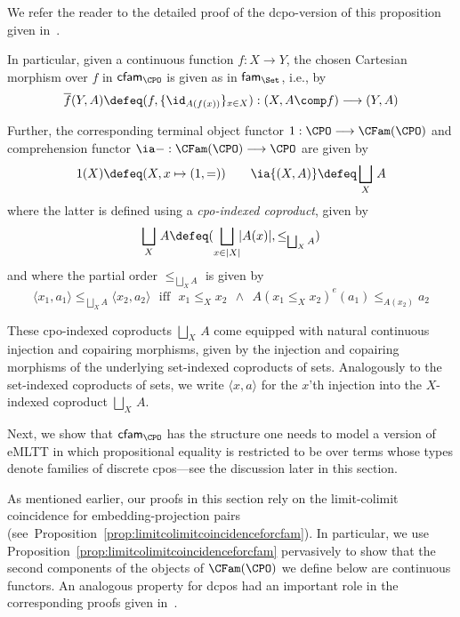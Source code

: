 We refer the reader to the detailed proof of the dcpo-version of this proposition given in~\cite[Lemma~10.6.2]{Jacobs:Book}.

In particular, given a continuous function $f : X \longrightarrow Y$, the chosen Cartesian morphism over $f$ in $\mathsf{cfam}_{\CPO}$ is given as in $\mathsf{fam}_{\Set}$, i.e., by
\[
\overline{f}(Y,A) \defeq (f , \{\id_{A(f(x))}\}_{x \in X}) : (X , A \comp f) \longrightarrow (Y,A)
\]

Further, the corresponding terminal object functor $1 : \CPO \longrightarrow \CFam(\CPO)$ and  comprehension functor $\ia - : \CFam(\CPO) \longrightarrow \CPO$ are given by
\[
1(X) \defeq (X , x \mapsto (1,=)) \qquad
\ia {(X,A)} \defeq \bigsqcup_{X}\, A
\]
where the latter is defined using a \emph{cpo-indexed coproduct}, given by
\[
\bigsqcup_{X}\, A \defeq (\bigsqcup_{x \in \vert X \vert}\!\! \vert A(x) \vert , \leq_{\bigsqcup_{X} A})
\]
and where the partial order $\leq_{\bigsqcup_{X} A}$ is given by
\[
\langle x_1,a_1 \rangle \leq_{\bigsqcup_{X} A} \langle x_2 , a_2 \rangle \text{~~iff~~} x_1 \leq_X x_2 ~~\wedge~~ A(x_1 \leq_X x_2)^e(a_1) \leq_{A(x_2)} a_2
\]

These cpo-indexed coproducts $\bigsqcup_{X}\, A$ come equipped with natural continuous injection and copairing morphisms, given by the injection and copairing morphisms of the underlying set-indexed coproducts of sets. Analogously to the set-indexed coproducts of sets, we write $\langle x , a \rangle$ for the $x$'th injection into the $X$-indexed coproduct $\bigsqcup_{X}\, A$. 

Next, we show that $\mathsf{cfam}_{\CPO}$ has the structure one needs to model a version of eMLTT in which propositional equality is restricted to be over terms whose types denote families of discrete cpos---see the discussion later in this section. 


As mentioned earlier, our proofs in this section rely on the limit-colimit coincidence for embedding-projection pairs (see~Proposition~\ref{prop:limitcolimitcoincidenceforcfam}). In particular, we use Proposition~\ref{prop:limitcolimitcoincidenceforcfam} pervasively to show that the second components of the objects of $\CFam(\CPO)$ we define below are continuous functors. An analogous property for dcpos had an important role in the corresponding proofs given in~\cite[Section~10.6]{Jacobs:Book}.




